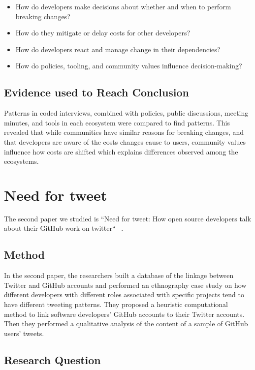 \documentclass[conference]{IEEEtran}
\begin{document}
\begin{itemize}
    \item How do developers make decisions about whether and when to perform breaking changes?
    \item How do they mitigate or delay costs for other developers?
    \item How do developers react and manage change in their dependencies?
    \item How do policies, tooling, and community values influence decision-making?
\end{itemize}

\subsection{Evidence used to Reach Conclusion}

Patterns in coded interviews, combined with policies, public discussions, meeting minutes, and tools in each ecosystem were compared to find patterns.
This revealed that while communities have similar reasons for breaking changes, and that developers are aware of the costs changes cause to users, community values influence how costs are shifted which explains differences observed among the ecosystems.

\section{Need for tweet}


The second paper we studied is ``Need for tweet: How open source developers talk about their GitHub work on twitter``~\cite{fang2020need} .


\subsection{Method}
In the second paper, the researchers built a database of the linkage between Twitter and GitHub accounts and performed an ethnography case study on how different developers with different roles associated with specific projects tend to have different tweeting patterns.
They proposed a heuristic computational method to link software developers' GitHub accounts to their Twitter accounts.
Then they performed a qualitative analysis of the content of a sample of GitHub users' tweets.
\subsection{Research Question}
\end{document}
